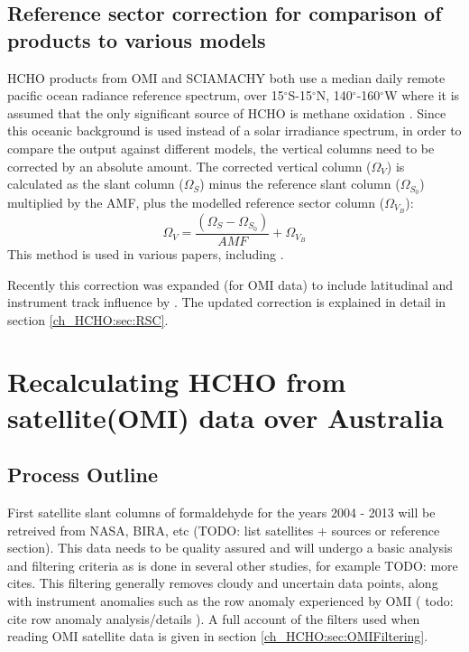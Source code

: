   \subsection{Reference sector correction for comparison of products to various models}
    HCHO products from OMI and SCIAMACHY both use a median daily remote pacific ocean radiance reference spectrum, over 15$^{\circ}$S-15$^{\circ}$N, 140$^{\circ}$-160$^{\circ}$W where it is assumed that the only significant source of HCHO is methane oxidation \citep{DeSmedt2008,Barkley2013,Kurosu2014}.
    Since this oceanic background is used instead of a solar irradiance spectrum, in order to compare the output against different models, the vertical columns need to be corrected by an absolute amount.
    The corrected vertical column ($\Omega_V$) is calculated as the slant column ($\Omega_S$) minus the reference slant column ($\Omega_{S_0}$) multiplied by the AMF, plus the modelled reference sector column ($\Omega_{V_B}$):
    \begin{equation*}
      \Omega_V = \frac{ \left( \Omega_S - \Omega_{S_0} \right) }{ AMF } + \Omega_{V_B}
    \end{equation*}
    This method is used in various papers, including \citet{DeSmedt2008, DeSmedt2012, DeSmedt2015, Barkley2013, Bauwens2016}.
    
    Recently this correction was expanded (for OMI data) to include latitudinal and instrument track influence by \citet{Abad2015}.
    The updated correction is explained in detail in section \ref{ch_HCHO:sec:RSC}.
    
\section{Recalculating HCHO from satellite(OMI) data over Australia}
\label{ch_HCHO:sec:creatinginventory}

  \subsection{Process Outline}
    First satellite slant columns of formaldehyde for the years 2004 - 2013 will be retreived from NASA, BIRA, etc (TODO: list satellites + sources or reference section).
    This data needs to be quality assured and will undergo a basic analysis and filtering criteria as is done in several other studies, for example \citet{Marais2012, Barkley2013, Bauwens2016, Zhu2016} TODO: more cites.
    This filtering generally removes cloudy and uncertain data points, along with instrument anomalies such as the row anomaly experienced by OMI ( todo: cite row anomaly analysis/details ).
    A full account of the filters used when reading OMI satellite data is given in section \ref{ch_HCHO:sec:OMIFiltering}.
    
